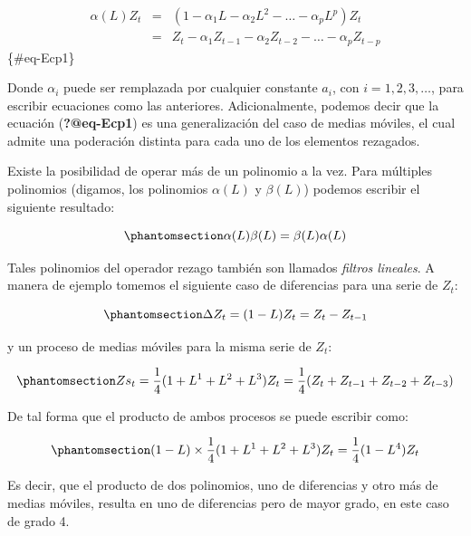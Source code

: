 \documentclass[
  a4paper,
]{article}
\begin{document}
\begin{eqnarray}
    \alpha(L) Z_{t} & = & (1 - \alpha_1 L - \alpha_2 L^2 - \ldots - \alpha_p L^p) Z_{t} \nonumber \\
    & = & Z_{t} - \alpha_1 Z_{t-1} - \alpha_2 Z_{t-2} - \ldots - \alpha_p Z_{t-p}
\end{eqnarray} \{\#eq-Ecp1\}

Donde \(\alpha_i\) puede ser remplazada por cualquier constante \(a_i\),
con \(i = 1, 2, 3, \ldots\), para escribir ecuaciones como las
anteriores. Adicionalmente, podemos decir que la ecuación
(\textbf{?@eq-Ecp1}) es una generalización del caso de medias móviles,
el cual admite una poderación distinta para cada uno de los elementos
rezagados.

Existe la posibilidad de operar más de un polinomio a la vez. Para
múltiples polinomios (digamos, los polinomios \(\alpha(L)\) y
\(\beta(L)\)) podemos escribir el siguiente resultado:

\begin{equation}\phantomsection\label{eq-Diff7}{
    \alpha(L) \beta(L) = \beta(L) \alpha(L)
}\end{equation}

Tales polinomios del operador rezago también son llamados \emph{filtros
lineales}. A manera de ejemplo tomemos el siguiente caso de diferencias
para una serie de \(Z_t\):

\begin{equation}\phantomsection\label{eq-Diff8}{
    \Delta Z_{t} = (1 - L) Z_{t} = Z_{t} - Z_{t-1} 
}\end{equation}

y un proceso de medias móviles para la misma serie de \(Z_t\):

\begin{equation}\phantomsection\label{eq-Diff9}{
Zs_{t} = \frac{1}{4}(1 + L^1 + L^2 + L^3) Z_{t} = \frac{1}{4}(Z_{t} + Z_{t-1} + Z_{t-2} + Z_{t-3}) 
}\end{equation}

De tal forma que el producto de ambos procesos se puede escribir como:

\begin{equation}\phantomsection\label{eq-Diff10}{
(1 - L) \times \frac{1}{4}(1 + L^1 + L^2 + L^3) Z_{t} = \frac{1}{4}(1 - L^4) Z_{t}
}\end{equation}

Es decir, que el producto de dos polinomios, uno de diferencias y otro
más de medias móviles, resulta en uno de diferencias pero de mayor
grado, en este caso de grado 4.


\printbibliography
\end{document}
